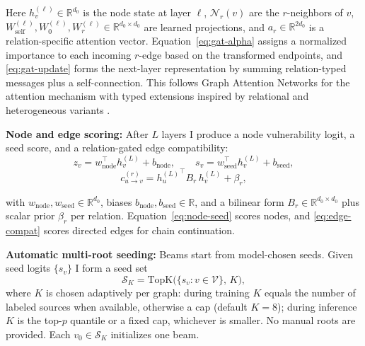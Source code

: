 \documentclass{buthesis}
\begin{document}
Here $h^{(\ell)}_v\!\in\!\mathbb{R}^{d_0}$ is the node state at layer $\ell$, $\mathcal{N}_r(v)$ are the $r$-neighbors of $v$, $W^{(\ell)}_{\mathrm{self}},W^{(\ell)}_0,W^{(\ell)}_r\!\in\!\mathbb{R}^{d_0\times d_0}$ are learned projections, and $a_r\!\in\!\mathbb{R}^{2d_0}$ is a relation-specific attention vector. Equation~\eqref{eq:gat-alpha} assigns a normalized importance to each incoming $r$-edge based on the transformed endpoints, and \eqref{eq:gat-update} forms the next-layer representation by summing relation-typed messages plus a self-connection. This follows Graph Attention Networks for the attention mechanism with typed extensions inspired by relational and heterogeneous variants \cite{velickovic2018gat,schlichtkrull2018rgcn,wang2019han}.



\textbf{Node and edge scoring:} After $L$ layers I produce a node vulnerability logit, a seed score, and a relation-gated edge compatibility:
\begin{equation}
\label{eq:node-seed}
z_v = w_{\mathrm{node}}^\top h^{(L)}_v + b_{\mathrm{node}},
\qquad
s_v = w_{\mathrm{seed}}^\top h^{(L)}_v + b_{\mathrm{seed}},
\end{equation}
\begin{equation}
\label{eq:edge-compat}
c^{(r)}_{u\to v} = {h^{(L)}_u}^\top B_r\, h^{(L)}_v + \beta_r,
\end{equation}

with $w_{\mathrm{node}},w_{\mathrm{seed}}\in\mathbb{R}^{d_0}$, biases $b_{\mathrm{node}},b_{\mathrm{seed}}\in\mathbb{R}$, and a bilinear form $B_r\in\mathbb{R}^{d_0\times d_0}$ plus scalar prior $\beta_r$ per relation. Equation~\eqref{eq:node-seed} scores nodes, and \eqref{eq:edge-compat} scores directed edges for chain continuation.

\textbf{Automatic multi-root seeding:} Beams start from model-chosen seeds. Given seed logits $\{s_v\}$ I form a seed set
\begin{equation}
\label{eq:seed-set}
\mathcal{S}_K = \mathrm{TopK}\big(\{s_v : v\in\mathcal{V}\},\,K\big),
\end{equation}
where $K$ is chosen adaptively per graph: during training $K$ equals the number of labeled sources when available, otherwise a cap (default $K{=}8$); during inference $K$ is the top-$p$ quantile or a fixed cap, whichever is smaller. No manual roots are provided. Each $v_0\in\mathcal{S}_K$ initializes one beam.
\end{document}

